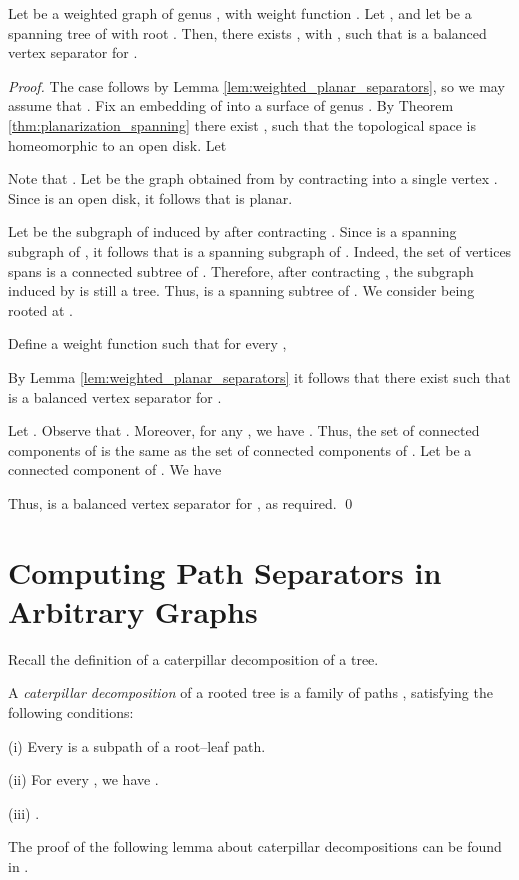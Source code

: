\documentclass[envcountsect]{llncs}
\begin{document}
\begin{lemma}\label{lem:genus_separator_weighted}
Let  be a weighted graph of genus , with weight function .
Let , and let  be a spanning tree of  with root .
Then, there exists , with , such that  is a balanced vertex separator for .
\end{lemma}
\begin{proof}
The case  follows by Lemma \ref{lem:weighted_planar_separators}, so we may assume that .
Fix an embedding  of  into a surface  of genus .
By Theorem \ref{thm:planarization_spanning} there exist , such that the topological space  is homeomorphic to an open disk.
Let

Note that .
Let  be the graph obtained from  by contracting  into a single vertex .
Since  is an open disk, it follows that  is planar.

Let  be the subgraph of  induced by  after contracting .
Since  is a spanning subgraph of , it follows that  is a spanning subgraph of .
Indeed, the set of vertices  spans is a connected subtree of .
Therefore, after contracting , the subgraph  induced by  is still a tree.
Thus,  is a spanning subtree of .
We consider  being rooted at .

Define a weight function  such that for every ,

By Lemma \ref{lem:weighted_planar_separators} it follows that there exist  such that  is a balanced vertex separator for .

Let .
Observe that .
Moreover, for any , we have .
Thus, the set of connected components of  is the same as the set of connected components of .
Let  be a connected component of .
We have

Thus,  is a balanced vertex separator for , as required.
\qed
\end{proof}

\section{Computing Path Separators in Arbitrary Graphs}
Recall the definition of a 
caterpillar decomposition of a tree.
\begin{definition}
A \emph{caterpillar decomposition}
of a rooted tree  is a family of paths , satisfying the following conditions:
\begin{description}
\item{(i)}
Every  is a subpath of a root--leaf path.
\item{(ii)}
For every , we have .
\item{(iii)}
.
\end{description}
\end{definition}
The proof of the following lemma about caterpillar decompositions can be found in \cite{matousek1999trees,charikar2002dimension}.
\end{document}
